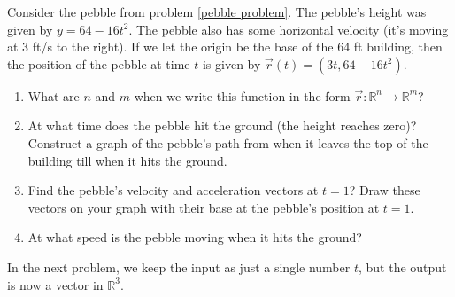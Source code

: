 \begin{problem}%
%
Consider the pebble from problem \ref{pebble problem}. The pebble's height was given by $y=64-16t^2$.  The pebble also has some horizontal velocity (it's moving at 3 ft/s to the right).  If we let the origin be the base of the 64 ft building, then the position of the pebble at time $t$ is given by $\vec r(t) = (3t, 64-16t^2)$.
 \begin{enumerate}
  \item What are $n$ and $m$ when we write this function in the form  $\vec r\colon {\mathbb{R}}^n\to {\mathbb{R}}^m$?
  \item At what time does the pebble hit the ground (the height reaches zero)?  Construct a graph of the pebble's path from when it leaves the top of the building till when it hits the ground.
  \item{}%
 Find the pebble's velocity and acceleration vectors at $t=1$? Draw these vectors on your graph with their base at the pebble's position at $t=1$. 
  \item At what speed is the pebble moving when it hits the ground?
 \end{enumerate}
\end{problem}

In the next problem, we keep the input as just a single number $t$, but the output is now a vector in $\mathbb{R}^3$.

